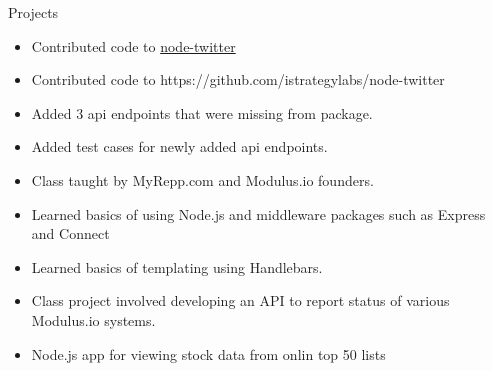 \begin{category}{Projects}


  \begin{itemize}
    \ifWebLinks
  \item Contributed code to \href{https://github.com/istrategylabs/node-twitter}{node-twitter}
    \else
  \item Contributed code to https://github.com/istrategylabs/node-twitter
    \fi
  \item Added 3 api endpoints that were missing from package.
  \item Added test cases for newly added api endpoints.
  \end{itemize}    
  
\begin{itemize}

\item Class taught by MyRepp.com and Modulus.io founders.
\item Learned basics of using Node.js and middleware packages such as Express and Connect
\item Learned basics of templating using Handlebars.
\item Class project involved developing an API to report status of various Modulus.io systems.
\end{itemize}

\ifWebLinks
{}
\else
{} 
\fi

\begin{itemize}
\item Node.js app for viewing stock data from onlin top 50 lists


  \ifWebLinks
\end{itemize}
\end{category}

